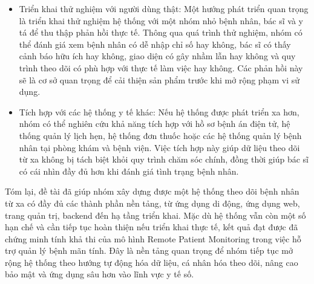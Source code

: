 \begin{itemize}
    \item Triển khai thử nghiệm với người dùng thật: Một hướng phát triển quan trọng là triển khai thử nghiệm hệ thống với một nhóm nhỏ bệnh nhân, bác sĩ và y tá để thu thập phản hồi thực tế. Thông qua quá trình thử nghiệm, nhóm có thể đánh giá xem bệnh nhân có dễ nhập chỉ số hay không, bác sĩ có thấy cảnh báo hữu ích hay không, giao diện có gây nhầm lẫn hay không và quy trình theo dõi có phù hợp với thực tế làm việc hay không. Các phản hồi này sẽ là cơ sở quan trọng để cải thiện sản phẩm trước khi mở rộng phạm vi sử dụng.

    \item Tích hợp với các hệ thống y tế khác: Nếu hệ thống được phát triển xa hơn, nhóm có thể nghiên cứu khả năng tích hợp với hồ sơ bệnh án điện tử, hệ thống quản lý lịch hẹn, hệ thống đơn thuốc hoặc các hệ thống quản lý bệnh nhân tại phòng khám và bệnh viện. Việc tích hợp này giúp dữ liệu theo dõi từ xa không bị tách biệt khỏi quy trình chăm sóc chính, đồng thời giúp bác sĩ có cái nhìn đầy đủ hơn khi đánh giá tình trạng bệnh nhân.
\end{itemize}

\par Tóm lại, đề tài đã giúp nhóm xây dựng được một hệ thống theo dõi bệnh nhân từ xa có đầy đủ các thành phần nền tảng, từ ứng dụng di động, ứng dụng web, trang quản trị, backend đến hạ tầng triển khai. Mặc dù hệ thống vẫn còn một số hạn chế và cần tiếp tục hoàn thiện nếu triển khai thực tế, kết quả đạt được đã chứng minh tính khả thi của mô hình Remote Patient Monitoring trong việc hỗ trợ quản lý bệnh mãn tính. Đây là nền tảng quan trọng để nhóm tiếp tục mở rộng hệ thống theo hướng tự động hóa dữ liệu, cá nhân hóa theo dõi, nâng cao bảo mật và ứng dụng sâu hơn vào lĩnh vực y tế số.